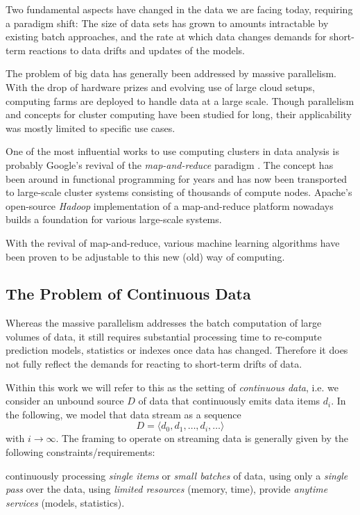 Two fundamental aspects have changed in the data we are facing today,
requiring a paradigm shift: The size of data sets has grown to amounts
intractable by existing batch approaches, and the rate at which data
changes demands for short-term reactions to data drifts and updates of
the models.

The problem of big data has generally been addressed by massive
parallelism. With the drop of hardware prizes and evolving use of
large cloud setups, computing farms are deployed to handle data at a
large scale. Though parallelism and concepts for cluster computing
have been studied for long, their applicability was mostly limited to
specific use cases.

One of the most influential works to use computing clusters in data
analysis is probably Google's revival of the {\em map-and-reduce}
paradigm \cite{googleMapReduce}. The concept has been around in
functional programming for years and has now been transported to
large-scale cluster systems consisting of thousands of compute
nodes. Apache's open-source {\em Hadoop} implementation of a
map-and-reduce platform nowadays builds a foundation for various
large-scale systems.

With the revival of map-and-reduce, various machine learning algorithms
have been proven to be adjustable to this new (old) way of computing.

\subsection{\label{sec:streamSetting}The Problem of Continuous Data}
Whereas the massive parallelism addresses the batch computation of
large volumes of data, it still requires substantial processing time
to re-compute prediction models, statistics or indexes once data has
changed. Therefore it does not fully reflect the demands for reacting
to short-term drifts of data.

Within this work we will refer to this as the setting of {\em
  continuous data}, i.e. we consider an unbound source $D$ of data
that continuously emits data items $d_i$. In the following, we model
that data stream as a sequence
$$D = \langle d_0,d_1,\ldots,d_i,\ldots \rangle$$
with $i\rightarrow\infty$. The framing to operate on streaming data is
generally given by the following constraints/requirements:
\begin{itemize}
   continuously processing {\em single items} or {\em small batches} of data,
   using only a {\em single pass} over the data,
   using {\em limited resources} (memory, time),
   provide {\em anytime services} (models, statistics).
\end{itemize}


